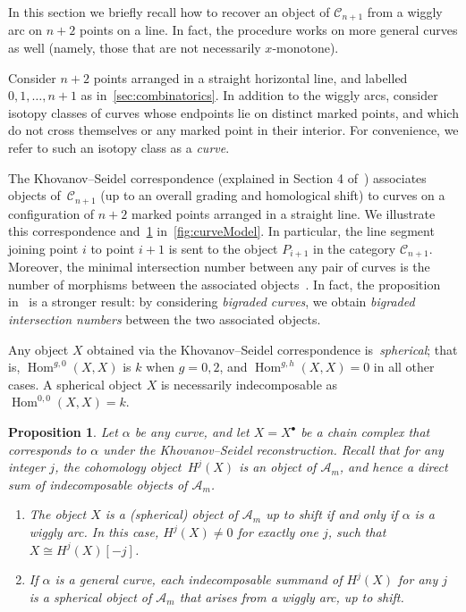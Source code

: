 \documentclass{amsart}
\newtheorem{proposition}[theorem]{Proposition}
\theoremstyle{definition}
\DeclareMathOperator{\Hom}{Hom} %
\newcommand{\darkblue}{\color{darkblue}} %
\newcommand{\defn}[1]{\textsl{\darkblue #1}} %
\begin{document}
In this section we briefly recall how to recover an object of \(\mathcal{C}_{n+1}\) from a wiggly arc on \(n+2\) points on a line.
In fact, the procedure works on more general curves as well (namely, those that are not necessarily \(x\)-monotone).

Consider \(n+2\) points arranged in a straight horizontal line, and labelled \(0,1, \ldots, n+1\) as in~\cref{sec:combinatorics}.
In addition to the wiggly arcs, consider isotopy classes of curves whose endpoints lie on distinct marked points, and which do not cross themselves or any marked point in their interior.
For convenience, we refer to such an isotopy class as a \defn{curve}.

The Khovanov--Seidel correspondence (explained in Section 4 of~\cite{kho.sei:02}) associates objects of~\(\mathcal{C}_{n+1}\) (up to an overall grading and homological shift) to curves on a configuration of \(n+2\) marked points arranged in a straight line.
We illustrate this correspondence and~\cref{prop:cohomology-pieces} in~\cref{fig:curveModel}.
In particular, the line segment joining point \(i\) to point \(i+1\) is sent to the object \(P_{i+1}\) in the category \(\mathcal{C}_{n+1}\).
Moreover, the minimal intersection number between any pair of curves is the number of morphisms between the associated objects~\cite[Prop.~4.9]{kho.sei:02}.
In fact, the proposition in~\cite{kho.sei:02} is a stronger result: by considering \emph{bigraded curves}, we obtain \emph{bigraded intersection numbers} between the two associated objects.

Any object \(X\) obtained via the Khovanov--Seidel correspondence is~\defn{spherical}; that is, \(\Hom^{g,0}(X,X)\) is \(k\) when \(g = 0,2\), and \(\Hom^{g,h}(X,X) = 0\) in all other cases.
A spherical object \(X\) is necessarily indecomposable as \(\Hom^{0,0}(X,X) = k\).

\begin{proposition}
\label{prop:cohomology-pieces}
Let \(\alpha\) be any curve, and let \(X = X^{\bullet}\) be a chain complex that corresponds to \(\alpha\) under the Khovanov--Seidel reconstruction.
Recall that for any integer \(j\), the cohomology object~\(H^j(X)\) is an object of \(\mathcal{A}_m\), and hence a direct sum of indecomposable objects of \(\mathcal{A}_m\).
\begin{enumerate}
\item The object \(X\) is a (spherical) object of \(\mathcal{A}_m\) up to shift if and only if \(\alpha\) is a wiggly arc. In this case, \(H^j(X) \neq 0\) for exactly one \(j\), such that \(X \cong H^j(X)[-j]\).
\item If \(\alpha\) is a general curve, each indecomposable summand of \(H^j(X)\) for any \(j\) is a spherical object of \(\mathcal{A}_m\) that arises from a wiggly arc, up to shift.
\end{enumerate}
\end{proposition}
\end{document}
